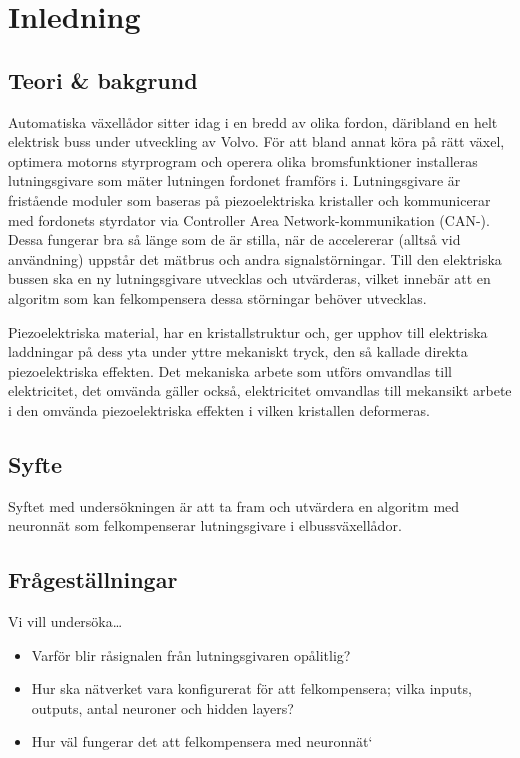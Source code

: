 \section{Inledning}
\subsection{Teori \& bakgrund}

Automatiska växellådor sitter idag i en bredd av olika fordon, däribland en
helt elektrisk buss under utveckling av Volvo.
För att bland annat köra på rätt växel, optimera motorns styrprogram och operera
olika bromsfunktioner %
installeras lutningsgivare som mäter lutningen fordonet framförs i.
Lutningsgivare är fristående moduler som baseras på piezoelektriska
kristaller och kommunicerar med fordonets styrdator via Controller
Area Network-kommunikation (CAN-).
Dessa fungerar bra så länge som de är stilla, när de accelererar (alltså vid
användning)  uppstår det mätbrus och andra signalstörningar.
Till den elektriska bussen ska en ny lutningsgivare utvecklas och utvärderas,
vilket innebär att en algoritm som kan felkompensera dessa störningar behöver
utvecklas.


Piezoelektriska material, har en kristallstruktur och, ger upphov till
elektriska laddningar på dess yta under yttre mekaniskt tryck, den så kallade
direkta piezoelektriska effekten.
Det mekaniska arbete som utförs omvandlas till elektricitet, det omvända gäller
också, elektricitet omvandlas till mekansikt arbete i den omvända
piezoelektriska effekten i vilken kristallen deformeras.
\autocite{electronicdesign2016}

\subsection{Syfte}
Syftet med undersökningen är att ta fram och utvärdera en algoritm med neuronnät som felkompenserar lutningsgivare i elbussväxellådor.

\subsection{Frågeställningar}
Vi vill undersöka\ldots
\begin{itemize}
	\item Varför blir råsignalen från lutningsgivaren opålitlig?
	\item Hur ska nätverket vara konfigurerat för att felkompensera; vilka inputs,
		outputs, antal neuroner och hidden layers?
	\item Hur väl fungerar det att felkompensera med neuronnät`
\end{itemize}
